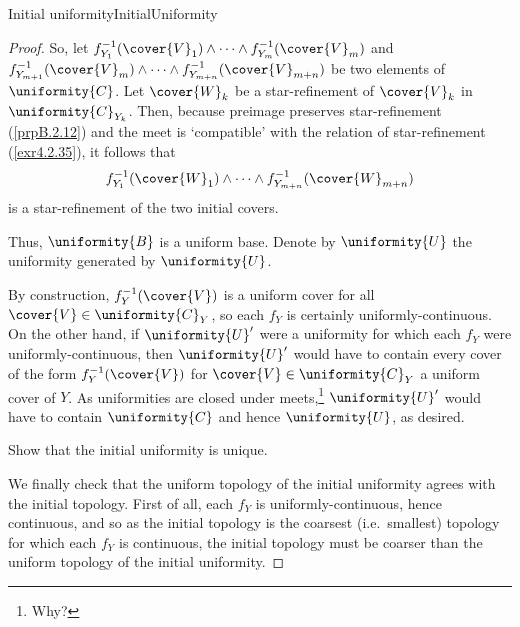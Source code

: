 \begin{prp}{Initial uniformity}{InitialUniformity}
\begin{proof}
So, let $f_{Y_1}^{-1}(\cover{V}_1)\wedge \cdots \wedge f_{Y_m}^{-1}(\cover{V}_m)$ and $f_{Y_{m+1}}^{-1}(\cover{V}_m)\wedge \cdots \wedge f_{Y_{m+n}}^{-1}(\cover{V}_{m+n})$ be two elements of $\uniformity{C}$.  Let $\cover{W}_k$ be a star-refinement of $\cover{V}_k$ in $\uniformity{C}_{Y_k}$.  Then, because preimage preserves star-refinement (\cref{prpB.2.12}) and the meet is `compatible' with the relation of star-refinement (\cref{exr4.2.35}), it follows that
\begin{equation}
f_{Y_1}^{-1}(\cover{W}_1)\wedge \cdots \wedge f_{Y_{m+n}}^{-1}(\cover{W}_{m+n})
\end{equation}
is a star-refinement of the two initial covers.

Thus, $\uniformity{B}$ is a uniform base.  Denote by $\uniformity{U}$ the uniformity generated by $\uniformity{U}$.

By construction, $f_Y^{-1}(\cover{V})$ is a uniform cover for all $\cover{V}\in \uniformity{C}_Y$, so each $f_Y$ is certainly uniformly-continuous.  On the other hand, if $\uniformity{U}'$ were a uniformity for which each $f_Y$ were uniformly-continuous, then $\uniformity{U}'$ would have to contain every cover of the form $f_Y^{-1}(\cover{V})$ for $\cover{V}\in \uniformity{C}_Y$ a uniform cover of $Y$.  As uniformities are closed under meets,\footnote{Why?} $\uniformity{U}'$ would have to contain $\uniformity{C}$ and hence $\uniformity{U}$, as desired.
\begin{exr}[breakable=false]{}{}
Show that the initial uniformity is unique.
\end{exr}

We finally check that the uniform topology of the initial uniformity agrees with the initial topology.  First of all, each $f_Y$ is uniformly-continuous, hence continuous, and so as the initial topology is the coarsest (i.e.~smallest) topology for which each $f_Y$ is continuous, the initial topology must be coarser than the uniform topology of the initial uniformity.


\end{proof}
\end{prp}
